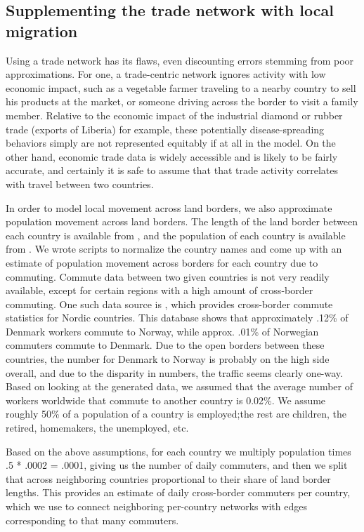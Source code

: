 \documentclass[10pt, journal,onecolumn]{IEEEtran}
\begin{document}
\subsection{{Supplementing the trade network with local migration}}
\label{SubSec:LocalData}

Using a trade network has its flaws, even discounting errors stemming from poor approximations.
For one, a trade-centric network ignores activity with low economic impact, such as
a vegetable farmer traveling to a nearby country to sell his products at the market, or someone
driving across the border to visit a family member. Relative to the economic impact of the industrial
diamond or rubber trade (exports of Liberia) for example, these potentially disease-spreading behaviors
simply are not represented equitably if at all in the model. On the other hand, economic trade data is
widely accessible and is likely to be fairly accurate,
and certainly it is safe to assume that that trade activity correlates with travel between two countries.

In order to model local movement across land borders, we also approximate population movement across land borders.
The length of the land border between each country is available from
\citep{cialandboundaries}, and the population of each country is available from \citep{ciapopulation}.
We wrote scripts to normalize the country names and come up with an estimate of population movement
across borders for each country due to commuting. Commute data between two given countries is not very
readily available, except for certain regions with a high amount of cross-border commuting.
One such data source is \citep{statnord}, which provides cross-border commute statistics for Nordic countries.
This database shows that approximately .12\% of Denmark workers commute to Norway, while approx. .01\% of
Norwegian commuters commute to Denmark. Due to the open borders between these countries, the number for
Denmark to Norway is probably on the high side overall, and due to the disparity in numbers, the traffic seems
clearly one-way. Based on looking at the generated data, we assumed that the average number of workers worldwide
that commute to another country is 0.02\%.
We assume roughly 50\% of a population of a country is employed;the rest are
children, the retired, homemakers, the unemployed, etc.

Based on the above assumptions, for each country we multiply population times .5 * .0002
= .0001, giving us the number of daily commuters, and then we split that across neighboring
countries proportional to their share of land border lengths. This provides an estimate
of daily cross-border commuters per country, which we use to connect neighboring per-country
networks with edges corresponding to that many commuters.
\end{document}
